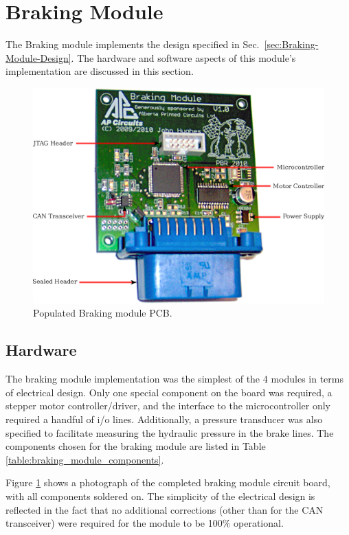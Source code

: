 \section{Braking Module}

The Braking module implements the design specified in Sec.\ \ref{sec:Braking-Module-Design}. The hardware and software aspects of this module's implementation are discussed in this section.

\begin{figure}[h]
\centering
\includegraphics[scale=1]{implementation/figures/braking_pcb}
\caption{Populated Braking module PCB.}
\label{fig:braking_pcb}
\end{figure}

\subsection{Hardware}

The braking module implementation was the simplest of the 4 modules in terms of electrical design. Only one special component on the board was required, a stepper motor controller/driver, and the interface to the microcontroller only required a handful of i/o lines. Additionally, a pressure transducer was also specified to facilitate measuring the hydraulic pressure in the brake lines. The components chosen for the braking module are listed in Table \ref{table:braking_module_components}.

Figure \ref{fig:braking_pcb} shows a photograph of the completed braking module circuit board, with all components soldered on. The simplicity of the electrical design is reflected in the fact that no additional corrections (other than for the CAN transceiver) were required for the module to be 100\% operational.

